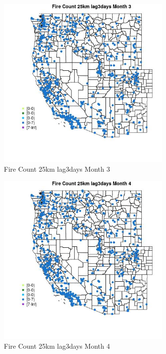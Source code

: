\begin{figure} 
\centering  
\includegraphics[width=0.77\textwidth]{Code_Outputs/Report_ML_input_PM25_Step4_part_e_de_duplicated_aves_compiled_2019-05-21wNAs_MapObsMo3Fire_Count_25km_lag3days.jpg} 
\caption{\label{fig:Report_ML_input_PM25_Step4_part_e_de_duplicated_aves_compiled_2019-05-21wNAsMapObsMo3Fire_Count_25km_lag3days}Fire Count 25km lag3days Month 3} 
\end{figure} 
 

\clearpage 

\begin{figure} 
\centering  
\includegraphics[width=0.77\textwidth]{Code_Outputs/Report_ML_input_PM25_Step4_part_e_de_duplicated_aves_compiled_2019-05-21wNAs_MapObsMo4Fire_Count_25km_lag3days.jpg} 
\caption{\label{fig:Report_ML_input_PM25_Step4_part_e_de_duplicated_aves_compiled_2019-05-21wNAsMapObsMo4Fire_Count_25km_lag3days}Fire Count 25km lag3days Month 4} 
\end{figure} 
 

